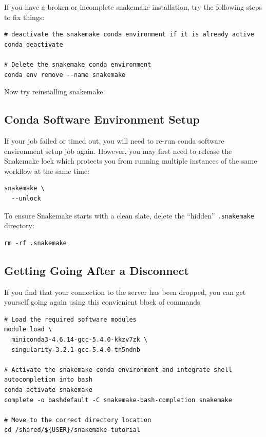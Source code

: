 If you have a broken or incomplete snakemake installation, try the following steps to fix things:

\begin{lstlisting}
# deactivate the snakemake conda environment if it is already active
conda deactivate

# Delete the snakemake conda environment
conda env remove --name snakemake
\end{lstlisting}

Now try reinstalling snakemake.

\subsection{Conda Software Environment Setup}

If your job failed or timed out, you will need to re-run conda software environment setup job again. However, you may first need to release the
Snakemake lock which protects you from running multiple instances of the same workflow at the same time:

\begin{lstlisting}
snakemake \
  --unlock
\end{lstlisting}

To ensure Snakemake starts with a clean slate, delete the ``hidden'' \texttt{.snakemake} directory:

\begin{lstlisting}
rm -rf .snakemake
\end{lstlisting}

\subsection{Getting Going After a Disconnect}

If you find that your connection to the server has been dropped, you can get yourself going again using this convienient block of commands:

\begin{lstlisting}
# Load the required software modules
module load \
  miniconda3-4.6.14-gcc-5.4.0-kkzv7zk \
  singularity-3.2.1-gcc-5.4.0-tn5ndnb

# Activate the snakemake conda environment and integrate shell autocompletion into bash
conda activate snakemake
complete -o bashdefault -C snakemake-bash-completion snakemake

# Move to the correct directory location
cd /shared/${USER}/snakemake-tutorial
\end{lstlisting}
